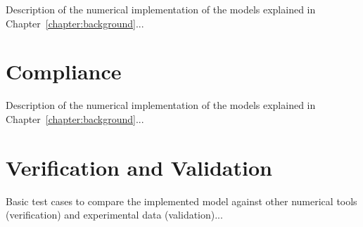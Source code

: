 Description of the numerical implementation of the models explained in Chapter~\ref{chapter:background}...



\section{Compliance}
\label{section:compliance}

Description of the numerical implementation of the models explained in Chapter~\ref{chapter:background}...



\section{Verification and Validation}
\label{section:verification}

Basic test cases to compare the implemented model against other numerical tools (verification) and experimental data (validation)...
